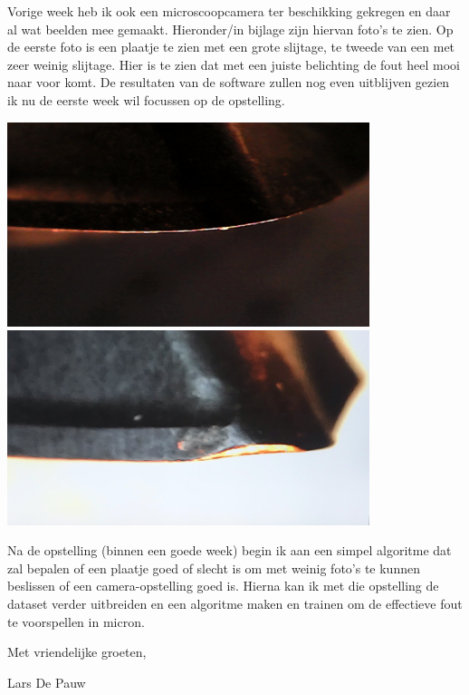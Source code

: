 \documentclass{scrartcl}
\begin{document}
 

Vorige week heb ik ook een microscoopcamera ter beschikking gekregen en daar al wat beelden mee gemaakt. Hieronder/in bijlage zijn hiervan foto’s te zien. Op de eerste foto is een plaatje te zien met een grote slijtage, te tweede van een met zeer weinig slijtage. Hier is te zien dat met een juiste belichting de fout heel mooi naar voor komt. De resultaten van de software zullen nog even uitblijven gezien ik nu de eerste week wil focussen op de opstelling.



\includegraphics[width=4.166667in, keepaspectratio=true]{./Masterproef_Tool_Wear_Inspection_-_Update_3_TJ/eerste-opstelling_donkere_achtergrond3.jpg}\includegraphics[width=4.166667in, keepaspectratio=true]{./Masterproef_Tool_Wear_Inspection_-_Update_3_TJ/eerste_setup_andere_richting_beeld2_screen image.jpeg}

 

Na de opstelling (binnen een goede week) begin ik aan een simpel algoritme dat zal bepalen of een plaatje goed of slecht is om met weinig foto’s te kunnen beslissen of een camera-opstelling goed is. Hierna kan ik met die opstelling de dataset verder uitbreiden en een algoritme maken en trainen om de effectieve fout te voorspellen in micron.

 

Met vriendelijke groeten,

 

Lars De Pauw
\end{document}

